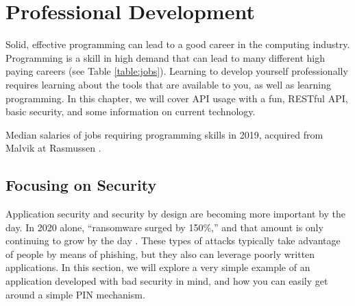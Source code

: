 \documentclass[12pt, oneside, a4paper]{book}
\begin{document}
   \chapter{Professional Development}
   \label{chap:prof_devel}
      Solid, effective programming can lead to a good career in the computing industry.
      Programming is a skill in high demand that can lead to many different high paying careers (see Table \ref*{table:jobs}).
      Learning to develop yourself professionally requires learning about the tools that are available to you, as well as learning programming.
      In this chapter, we will cover API usage with a fun, RESTful API, basic security, and some information on current technology.
      \begin{table}[H]
         \caption{
            Median salaries of jobs requiring programming skills in 2019, acquired from Malvik at Rasmussen \autocite{malvikProgrammingCareersCoding}.
         }
         \label{table:jobs}
      \end{table}

      \section{Focusing on Security}
      Application security and security by design are becoming more important by the day.
      In 2020 alone, ``ransomware surged by 150\%,'' and that amount is only continuing to grow by the day \autocite{muncasterRansomwareAttacksSoared2021}.
      These types of attacks typically take advantage of people by means of phishing, but they also can leverage poorly written applications.
      In this section, we will explore a very simple example of an application developed with bad security in mind, and how you can easily get around a simple PIN mechanism.
\end{document}

